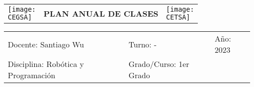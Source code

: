 \documentclass[landscape, a4paper, 10pt]{article}
\newcommand{\profesor}{Santiago Wu}
\newcommand{\discipline}{Robótica y Programación}
\newcommand{\currentyear}{2023}
\newcommand{\CEGSA}{cegsa-logo.png}
\newcommand{\CETSA}{cetsa-logo.png}
\begin{document}
	\begin{tabularx}{\textwidth}{ >{\raggedright\arraybackslash}X >{\centering\arraybackslash}X >{\raggedleft\arraybackslash}X }
		\texttt{[image: \\CEGSA]} &
		\textbf{PLAN ANUAL DE CLASES} &
		\texttt{[image: \\CETSA]}
	\end{tabularx}
	\begin{tabularx}{\textwidth}{ >{\raggedright\arraybackslash}X >{\raggedright\arraybackslash}X >{\raggedright\arraybackslash}X }
		Docente: \profesor &
		Turno: - &
		Año: \currentyear \\
		Disciplina: \discipline &
		Grado/Curso: 1er Grado &
		 \\
	\end{tabularx}
	\centering
\end{document}
